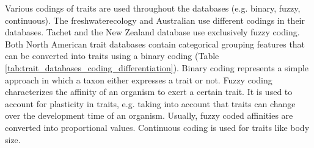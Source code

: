 \documentclass[../Draft_harmonization_paper.tex]{subfiles}
\begin{document}
Various codings of traits are used throughout the databases (e.g. binary, fuzzy, continuous). The freshwaterecology and Australian use different codings in their databases. Tachet and the New Zealand database use exclusively fuzzy coding. Both North American trait databases contain categorical grouping features that can be converted into traits using a binary coding (Table \ref{tab:trait_databases_coding_differentiation}). Binary coding represents a simple approach in which a taxon either expresses a trait or not. Fuzzy coding characterizes the affinity of an organism to exert a certain trait. It is used to account for plasticity in traits, e.g. taking into account that traits can change over the development time of an organism. Usually, fuzzy coded affinities are converted into proportional values. Continuous coding is used for traits like body size.


\end{document}
